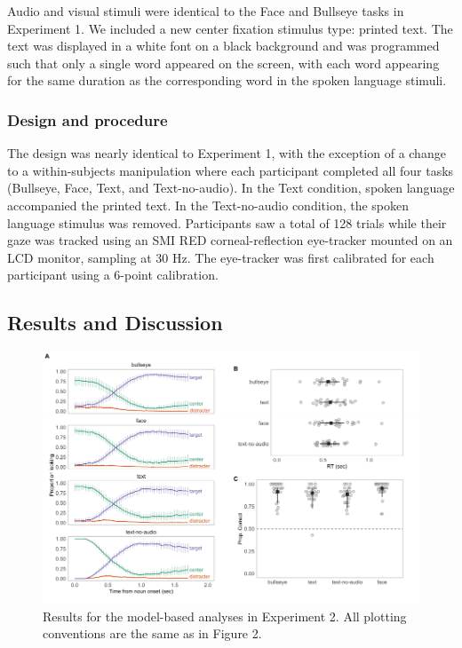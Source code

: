 \documentclass[english,floatsintext,man]{apa6}
\begin{document}
Audio and visual stimuli were identical to the Face and Bullseye tasks
in Experiment 1. We included a new center fixation stimulus type:
printed text. The text was displayed in a white font on a black
background and was programmed such that only a single word appeared on
the screen, with each word appearing for the same duration as the
corresponding word in the spoken language stimuli.

\hypertarget{design-and-procedure-1}{%
\subsubsection{Design and procedure}\label{design-and-procedure-1}}

The design was nearly identical to Experiment 1, with the exception of a
change to a within-subjects manipulation where each participant
completed all four tasks (Bullseye, Face, Text, and Text-no-audio). In
the Text condition, spoken language accompanied the printed text. In the
Text-no-audio condition, the spoken language stimulus was removed.
Participants saw a total of 128 trials while their gaze was tracked
using an SMI RED corneal-reflection eye-tracker mounted on an LCD
monitor, sampling at 30 Hz. The eye-tracker was first calibrated for
each participant using a 6-point calibration.

\hypertarget{results-and-discussion-1}{%
\subsection{Results and Discussion}\label{results-and-discussion-1}}

\begin{figure}[!t]

{\centering \includegraphics[width=0.9\linewidth]{figs/text-plot-1} 

}

\caption{Results for the model-based analyses in Experiment 2. All plotting conventions are the same as in Figure 2.}\label{fig:text-plot}
\end{figure}
\end{document}

